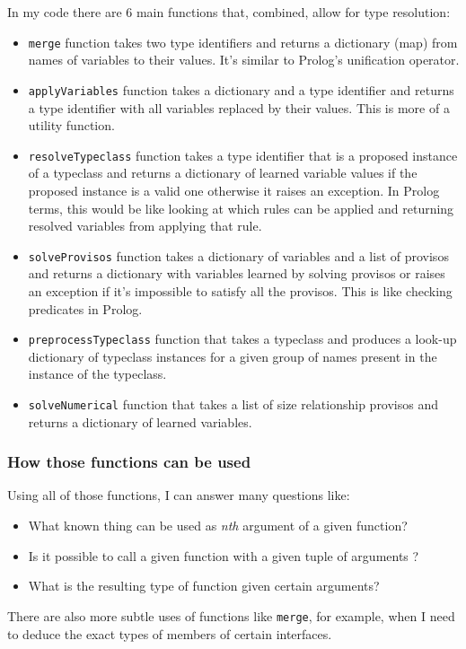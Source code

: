 \documentclass[12pt]{report}
\begin{document}
\par
In my code there are 6 main functions that, combined, allow for type resolution:
\begin{itemize}
    \item \verb!merge! function takes two type identifiers and returns a dictionary (map) from names of variables to their values. It's similar to Prolog's unification operator.
    \item \verb!applyVariables! function takes a dictionary and a type identifier and returns a type identifier with all variables replaced by their values. This is more of a utility function.
    \item \verb!resolveTypeclass! function takes a type identifier that is a proposed instance of a typeclass and returns a dictionary of learned variable values if the proposed instance is a valid one otherwise it raises an exception. In Prolog terms, this would be like looking at which rules can be applied and returning resolved variables from applying that rule.
    \item \verb!solveProvisos! function takes a dictionary of variables and a list of provisos and returns a dictionary with variables learned by solving provisos or raises an exception if it's impossible to satisfy all the provisos. This is like checking predicates in Prolog.
    \item \verb!preprocessTypeclass! function that takes a typeclass and produces a look-up dictionary of typeclass instances for a given group of names present in the instance of the typeclass.
    \item \verb!solveNumerical! function that takes a list of size relationship provisos and returns a dictionary of learned variables.
\end{itemize}
\subsubsection{How those functions can be used}
Using all of those functions, I can answer many questions like:
\begin{itemize}
    \item What known thing can be used as \emph{nth} argument of a given function?
    \item Is it possible to call a given function with a given tuple of arguments ?
    \item What is the resulting type of function given certain arguments?
\end{itemize}
There are also more subtle uses of functions like \verb!merge!, for example, when I need to deduce the exact types of members of certain interfaces.
\end{document}
